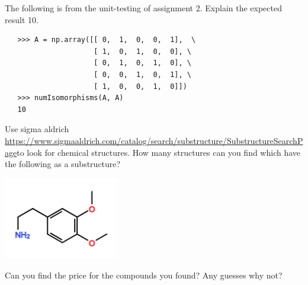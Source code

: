 \documentclass[10pt]{article}
\begin{document}

\noindent The following is from the unit-testing of assignment 2. Explain the expected result 10.

\begin{verbatim}
   >>> A = np.array([[ 0,  1,  0,  0,  1],  \
                     [ 1,  0,  1,  0,  0], \
                     [ 0,  1,  0,  1,  0], \
                     [ 0,  0,  1,  0,  1], \
                     [ 1,  0,  0,  1,  0]])
   >>> numIsomorphisms(A, A)
   10
\end{verbatim}



\noindent Use sigma aldrich \url{https://www.sigmaaldrich.com/catalog/search/substructure/SubstructureSearchPage}to look for chemical structures. How many structures can you find which have the following as a substructure?

\includegraphics[width=5cm]{mesc.png}

Can you find the price for the compounds you found? Any guesses why not?
\end{document}

